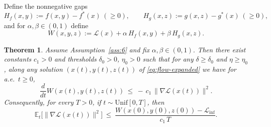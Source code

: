 \documentclass{article}
\newtheorem{theorem}{Theorem}[section]
\newcommand{\1}{\mathbf{1}}
\begin{document}
\noindent Define the nonnegative gaps
\[
H_f(x,y):=f(x,y)-f^*(x)\ (\ge 0),
\qquad
H_g(x,z):=g(x,z)-g^*(x)\ (\ge 0),
\]
and for $\alpha,\beta\in(0,1)$ define
\begin{equation}\label{eq:W-def}
W(x,y,z):=\mathcal L(x)+\alpha\,H_f(x,y)+\beta\,H_g(x,z).
\end{equation}



\begin{theorem}\label{thm:ergodic}
Assume Assumption~\ref{ass:6} and fix $\alpha,\beta\in(0,1)$.
Then there exist constants $c_1>0$ and thresholds $\delta_0>0$, $\eta_0>0$
such that for any $\delta\ge \delta_0$ and $\eta\ge \eta_0$, along any solution
$(x(t),y(t),z(t))$ of \eqref{eq:flow-expanded} we have for a.e.\ $t\ge 0$,
\begin{equation}\label{eq:Wdot-final1}
\frac{d}{dt}W(x(t),y(t),z(t))
\ \le\
-\,c_1\,\|\nabla \mathcal L(x(t))\|^2.
\end{equation}
Consequently, for every $T>0$, if $t\sim\mathrm{Unif}[0,T]$, then
\begin{equation}\label{eq:ergodic-rate}
\mathbb E_t\bigl[\|\nabla \mathcal L(x(t))\|^2\bigr]
\ \le\
\frac{W(x(0),y(0),z(0))-\mathcal L_{\inf}}{c_1\,T}.
\end{equation}
\end{theorem}
\end{document}
